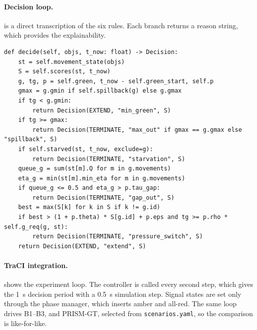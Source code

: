 \paragraph{Decision loop.}  is a direct transcription of the six rules. Each branch returns a reason string, which provides the explainability.

\begin{lstlisting}[style=py,caption={The \texttt{decide()} rule cascade (\texttt{control/prism.py})},label={lst:impl-decide}]
def decide(self, objs, t_now: float) -> Decision:
    st = self.movement_state(objs)
    S = self.scores(st, t_now)
    g, tg, p = self.green, t_now - self.green_start, self.p
    gmax = g.gmin if self.spillback(g) else g.gmax
    if tg < g.gmin:
        return Decision(EXTEND, "min_green", S)
    if tg >= gmax:
        return Decision(TERMINATE, "max_out" if gmax == g.gmax else "spillback", S)
    if self.starved(st, t_now, exclude=g):
        return Decision(TERMINATE, "starvation", S)
    queue_g = sum(st[m].Q for m in g.movements)
    eta_g = min(st[m].min_eta for m in g.movements)
    if queue_g <= 0.5 and eta_g > p.tau_gap:
        return Decision(TERMINATE, "gap_out", S)
    best = max(S[k] for k in S if k != g.id)
    if best > (1 + p.theta) * S[g.id] + p.eps and tg >= p.rho * self.g_req(g, st):
        return Decision(TERMINATE, "pressure_switch", S)
    return Decision(EXTEND, "extend", S)
\end{lstlisting}

\paragraph{TraCI integration.}  shows the experiment loop. The controller is called
every second step, which gives the 1~s decision period with a 0.5~s simulation step. Signal states are
set only through the phase manager, which inserts amber and all-red. The same loop drives B1--B3,
\prism{} and PRISM-GT, selected from \texttt{scenarios.yaml}, so the comparison is like-for-like.

